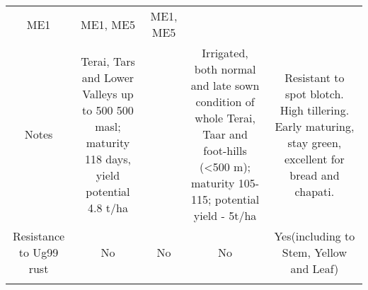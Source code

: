 \documentclass[]{article}
\begin{document}
\begin{longtable}[]{@{}ccccc@{}}
\begin{minipage}[t]{0.08\columnwidth}
ME1\strut
\end{minipage} & \begin{minipage}[t]{0.11\columnwidth}\centering\strut
ME1, ME5\strut
\end{minipage} & \begin{minipage}[t]{0.08\columnwidth}\centering\strut
ME1, ME5\strut
\end{minipage} & \begin{minipage}[t]{0.12\columnwidth}\centering\strut
\strut
\end{minipage}\tabularnewline
\begin{minipage}[t]{0.06\columnwidth}\centering\strut
Notes\strut
\end{minipage} & \begin{minipage}[t]{0.08\columnwidth}\centering\strut
Terai, Tars and Lower Valleys up to 500 500 masl; maturity 118 days,
yield potential 4.8 t/ha\strut
\end{minipage} & \begin{minipage}[t]{0.11\columnwidth}\centering\strut
\strut
\end{minipage} & \begin{minipage}[t]{0.08\columnwidth}\centering\strut
Irrigated, both normal and late sown condition of whole Terai, Taar and
foot-hills (\textless{}500 m); maturity 105-115; potential yield -
5t/ha\strut
\end{minipage} & \begin{minipage}[t]{0.12\columnwidth}\centering\strut
Resistant to spot blotch. High tillering. Early maturing, stay green,
excellent for bread and chapati.\strut
\end{minipage}\tabularnewline
\begin{minipage}[t]{0.06\columnwidth}\centering\strut
Resistance to Ug99 rust\strut
\end{minipage} & \begin{minipage}[t]{0.08\columnwidth}\centering\strut
No\strut
\end{minipage} & \begin{minipage}[t]{0.11\columnwidth}\centering\strut
No\strut
\end{minipage} & \begin{minipage}[t]{0.08\columnwidth}\centering\strut
No\strut
\end{minipage} & \begin{minipage}[t]{0.12\columnwidth}\centering\strut
Yes(including to Stem, Yellow and Leaf)\strut
\end{minipage}\tabularnewline
\begin{minipage}[t]{0.06\columnwidth}\centering\strut

\end{minipage}
\end{longtable}
\end{document}
